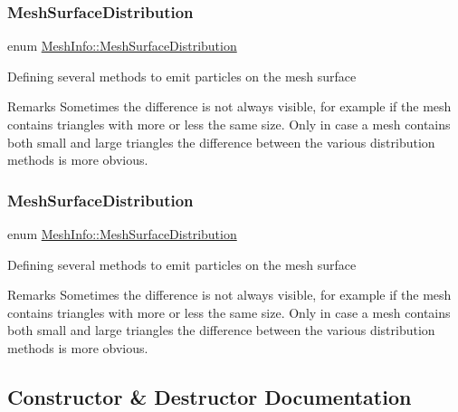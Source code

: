 \subsubsection{\texorpdfstring{Mesh\+Surface\+Distribution}{MeshSurfaceDistribution}\hspace{0.1cm}{\footnotesize\ttfamily [1/2]}}
{\footnotesize\ttfamily enum \hyperlink{classMeshInfo_aadc99105abbc3bd033e33c6ba512a13b}{Mesh\+Info\+::\+Mesh\+Surface\+Distribution}}

Defining several methods to emit particles on the mesh surface \begin{DoxyRemark}{Remarks}
Sometimes the difference is not always visible, for example if the mesh contains triangles with more or less the same size. Only in case a mesh contains both small and large triangles the difference between the various distribution methods is more obvious. 
\end{DoxyRemark}
\mbox{\label{classMeshInfo_aadc99105abbc3bd033e33c6ba512a13b}} 
\subsubsection{\texorpdfstring{Mesh\+Surface\+Distribution}{MeshSurfaceDistribution}\hspace{0.1cm}{\footnotesize\ttfamily [2/2]}}
{\footnotesize\ttfamily enum \hyperlink{classMeshInfo_aadc99105abbc3bd033e33c6ba512a13b}{Mesh\+Info\+::\+Mesh\+Surface\+Distribution}}

Defining several methods to emit particles on the mesh surface \begin{DoxyRemark}{Remarks}
Sometimes the difference is not always visible, for example if the mesh contains triangles with more or less the same size. Only in case a mesh contains both small and large triangles the difference between the various distribution methods is more obvious. 
\end{DoxyRemark}


\subsection{Constructor \& Destructor Documentation}
\mbox{\label{classMeshInfo_a5ccfea990dba31ade66e5358b05b20b6}} 
